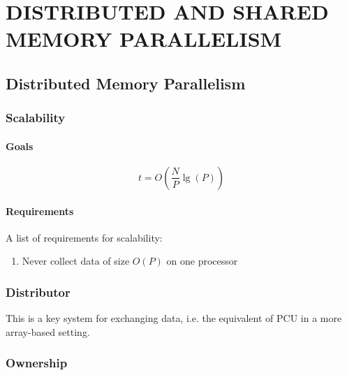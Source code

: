 
\chapter{DISTRIBUTED AND SHARED MEMORY PARALLELISM}

\section{Distributed Memory Parallelism}

\subsection{Scalability}

\subsubsection{Goals}

\begin{equation} \label{eq:big-o-scale}
t = O\left(\frac{N}{P}\lg(P)\right)
\end{equation}

\subsubsection{Requirements}

A list of requirements for scalability:

\begin{enumerate}
\item Never collect data of size $O(P)$ on one processor
\end{enumerate}

\subsection{Distributor}

This is a key system for exchanging data, i.e.
the equivalent of PCU in a more array-based setting.

\subsection{Ownership}

